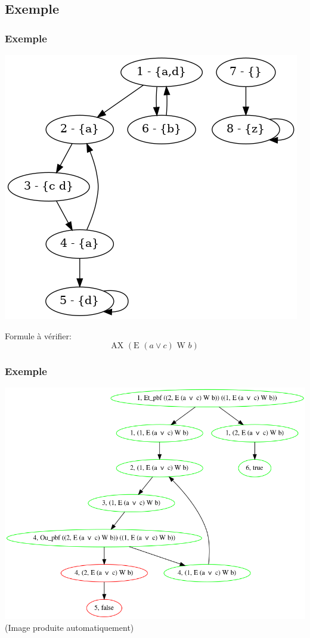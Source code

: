 \documentclass[11pt]{beamer}
\begin{document}
\subsection{Exemple}
\begin{frame}
	\frametitle{Exemple}
	\begin{center}
	\includegraphics[scale=0.35]{imgs/g2.png}
	\end{center}
Formule à vérifier:
	$$ \mbox{AX } (\mbox{E } (a \lor c) \mbox{ W } b) $$
\end{frame}

\begin{frame}
	\frametitle{Exemple}
	\begin{center}
    \includegraphics[scale=0.325]{imgs/g2-AXEa+cWb.png}\\
    (Image produite automatiquement)
	\end{center}
\end{frame}
\end{document}
